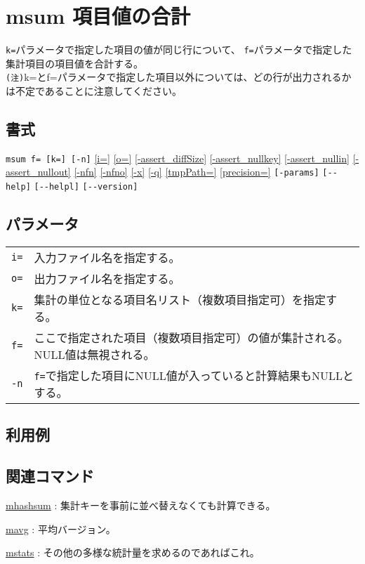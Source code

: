 
%

\section{msum 項目値の合計\label{sect:msum}}
\verb|k=|パラメータで指定した項目の値が同じ行について、
\verb|f=|パラメータで指定した集計項目の項目値を合計する。\\
\verb|(注)|k=とf=パラメータで指定した項目以外については、どの行が出力されるかは不定であることに注意してください。\\

\subsection*{書式}
\verb|msum f= [k=] [-n]| 
\hyperref[sect:option_i]{[i=]}
\hyperref[sect:option_o]{[o=]}
\hyperref[sect:option_assert_diffSize]{[-assert\_diffSize]}
\hyperref[sect:option_assert_nullkey]{[-assert\_nullkey]}
\hyperref[sect:option_assert_nullin]{[-assert\_nullin]}
\hyperref[sect:option_assert_nullout]{[-assert\_nullout]}
\hyperref[sect:option_nfn]{[-nfn]} 
\hyperref[sect:option_nfno]{[-nfno]}  
\hyperref[sect:option_x]{[-x]}
\hyperref[sect:option_q]{[-q]}
\hyperref[sect:option_tmpPath]{[tmpPath=]} 
\hyperref[sect:option_precision]{[precision=]}
\verb|[-params]|
\verb|[--help]|
\verb|[--helpl]|
\verb|[--version]|\\

\subsection*{パラメータ}
\begin{table}[htbp]
{\small
\begin{tabular}{ll}
\verb|i=|    & 入力ファイル名を指定する。\\
\verb|o=|    & 出力ファイル名を指定する。\\ 
\verb|k=|    & 集計の単位となる項目名リスト（複数項目指定可）を指定する。\\
\verb|f=|    & ここで指定された項目（複数項目指定可）の値が集計される。NULL値は無視される。 \\
\verb|-n|    & \verb|f=|で指定した項目にNULL値が入っていると計算結果もNULLとする。\\
\end{tabular} 
}
\end{table} 

\subsection*{利用例}

\subsection*{関連コマンド}
\hyperref[sect:mhashsum]{mhashsum} : 集計キーを事前に並べ替えなくても計算できる。

\hyperref[sect:mavg]{mavg} : 平均バージョン。

\hyperref[sect:mstats]{mstats} : その他の多様な統計量を求めるのであればこれ。

%
